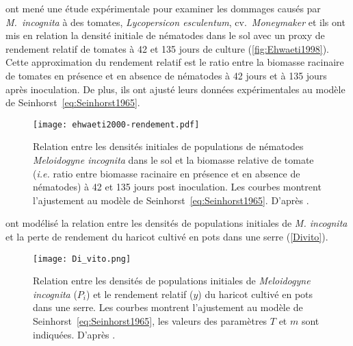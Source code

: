 	\citet{Ehwaeti1998} ont mené une étude expérimentale pour examiner les dommages causés par
\textit{M.~incognita} à des  tomates, \textit{Lycopersicon esculentum}, cv.~\textit{Moneymaker} et ils ont mis en relation la densité initiale de  nématodes dans le sol avec un proxy de rendement relatif de tomates  à 42 et 135 jours de culture (\autoref{fig:Ehwaeti1998}). Cette approximation du rendement relatif est le ratio entre la biomasse racinaire  de tomates en présence et en absence de nématodes à 42 jours et à 135 jours après inoculation. De plus, ils ont ajusté leurs données expérimentales au  modèle de Seinhorst~\eqref{eq:Seinhorst1965}.
	
	\begin{figure}[htp]
		\centering \texttt{[image: ehwaeti2000-rendement.pdf]}
		\caption[Rendement relatif de tomate en fonction des densités initiales de \textit{Meloidogyne incognita} dans le sol \citep{Ehwaeti1998}.]{Relation entre les densités initiales de populations  de nématodes \textit{Meloidogyne incognita} dans le sol et la biomasse relative de tomate (\textit{i.e.} ratio entre  biomasse racinaire  en présence et en absence de nématodes) à 42 et 135 jours post inoculation. Les courbes montrent l'ajustement au modèle de Seinhorst~\eqref{eq:Seinhorst1965}. D'après \citet{Ehwaeti1998,Ehwaeti2000}.}
		\label{fig:Ehwaeti1998}
	\end{figure}
		
	\citet{DiVito2004} ont modélisé la  relation entre les densités de populations initiales de \textit{M. incognita} et la perte de rendement du haricot cultivé en pots dans une serre (\autoref{Divito}).
	
\begin{figure}[hbtp]
\centering \texttt{[image: Di\_vito.png]}
\caption[Rendement relatif de haricot en fonction des densités initiales de \textit{Meloidogyne incognita} dans le sol \citep{DiVito2004}.]{Relation entre les densités de populations initiales de \textit{Meloidogyne incognita} ($P_i$) et le rendement relatif ($y$) du haricot cultivé en pots dans une serre. Les courbes montrent l'ajustement au modèle de Seinhorst~\eqref{eq:Seinhorst1965}, les valeurs des paramètres $T$ et $m$ sont indiquées. D'après \citet{DiVito2004}.}
\label{Divito}
\end{figure}
	
